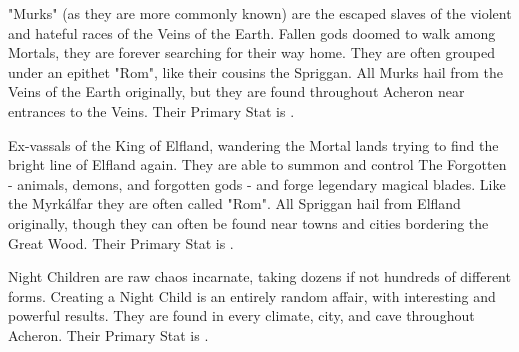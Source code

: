 {{    \item {}  "Murks" (as they are more commonly known) are the escaped slaves of the violent and hateful races of the Veins of the Earth.  Fallen gods doomed to walk among Mortals, they are forever searching for their way home.  They are often grouped under an epithet "Rom", like their cousins the Spriggan. All Murks hail from the Veins of the Earth originally, but they are found throughout Acheron near entrances to the Veins.  Their Primary Stat is .

    \item {} Ex-vassals of the King of Elfland, wandering the Mortal lands trying to find the bright line of Elfland again.  They are able to summon and control The Forgotten - animals, demons, and forgotten gods - and forge legendary magical blades.  Like the Myrkálfar they are often called "Rom".  All Spriggan hail from Elfland originally, though they can often be found near towns and cities bordering the Great Wood. Their Primary Stat is .
    
    \item {}  Night Children are raw chaos incarnate, taking dozens if not hundreds of different forms.  Creating a Night Child is an entirely random affair, with interesting and powerful results. They are found in every climate, city, and cave throughout Acheron. Their Primary Stat is .
  }

  \newpage


  
  \newpage
  
  \newpage
  
  \newpage
  
  \newpage





} %
